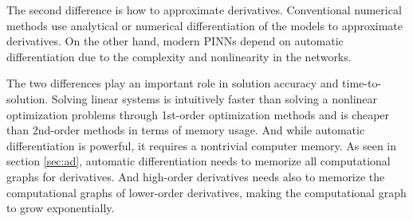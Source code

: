 The second difference is how to approximate derivatives.
Conventional numerical methods use analytical or numerical differentiation of the models to approximate derivatives.
On the other hand, modern PINNs depend on automatic differentiation due to the complexity and nonlinearity in the networks.

The two differences play an important role in solution accuracy and time-to-solution.
Solving linear systems is intuitively faster than solving a nonlinear optimization problems through 1st-order optimization methods and is cheaper than 2nd-order methods in terms of memory usage.
And while automatic differentiation is powerful, it requires a nontrivial computer memory.
As seen in section \ref{sec:ad}, automatic differentiation needs to memorize all computational graphs for derivatives.
And high-order derivatives needs also to memorize the computational graphs of lower-order derivatives, making the computational graph to grow exponentially.

